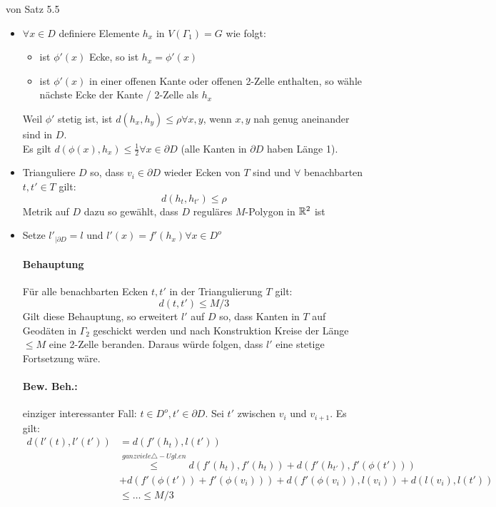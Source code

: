 \documentclass{article}
\begin{document}
\begin{Beweis}{von Satz 5.5}
\begin{itemize}
	\item $\forall x \in D$ definiere Elemente $h_x$ in $V(\Gamma_1) = G$ wie folgt:
	\begin{itemize}
		\item ist $\phi'(x)$ Ecke, so ist $h_x = \phi'(x)$
		\item ist $\phi'(x)$ in einer offenen Kante oder offenen 2-Zelle enthalten, so wähle nächste Ecke der Kante / 2-Zelle als $h_x$ 
	\end{itemize}
	Weil $\phi'$ stetig ist, ist $d(h_x, h_y) \leq \rho \forall x,y$, wenn $x,y$ nah genug aneinander sind in $D$.\\
	Es gilt $d(\phi(x), h_x) \leq \frac{1}{2} \forall x \in \partial D$ (alle Kanten in $\partial D$ haben Länge 1).
	\item Trianguliere $D$ so, dass $v_i \in \partial D$ wieder Ecken von $T$ sind und $\forall$ benachbarten $t,t' \in T$ gilt:
	\[d(h_t, h_{t'}) \leq \rho \]
	Metrik auf $D$ dazu so gewählt, dass $D$ reguläres $M$-Polygon in $\mathbb{R}^2$ ist
	\item Setze $l'_{|\partial D} = l$ und $l'(x) = f'(h_x) \forall x \in D^o$
	\paragraph{Behauptung}
	Für alle benachbarten Ecken $t,t'$ in der Triangulierung $T$ gilt:
	\[d(t,t') \leq M/3 \]
	Gilt diese Behauptung, so erweitert $l'$ auf $D$ so, dass Kanten in $T$ auf Geodäten in $\Gamma_2$ geschickt werden und nach Konstruktion Kreise der Länge $\leq M$ eine 2-Zelle beranden. Daraus würde folgen, dass $l'$ eine stetige Fortsetzung wäre.
	\paragraph{Bew. Beh.:} einziger interessanter Fall: $t\in D^o, t' \in \partial D$. Sei $t'$ zwischen $v_i$ und $v_{i+1}$. Es gilt:
	\begin{align*}
	d(l'(t), l'(t')) &= d(f'(h_t), l(t'))\\
	&\overset{ganz viele \triangle-Ugl.en}{\leq} d(f'(h_t), f'(h_t))  + d(f'(h_{t'}), f'(\phi(t')))\\
	&+ d(f'(\phi(t')) + f'(\phi(v_i)) ) + d(f'(\phi(v_i)), l(v_i) ) + d(l(v_i), l(t'))\\
	&\leq \ldots \leq M/3
	\end{align*}
\end{itemize}
\end{Beweis}
\end{document}
